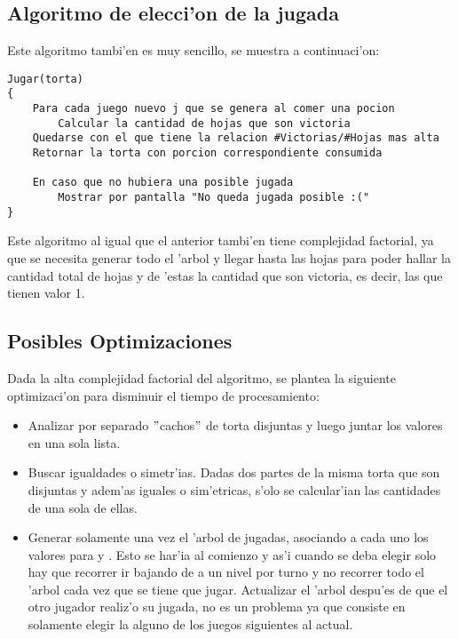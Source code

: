 \documentclass[spanish, a4paper, 10pt, titlepage]{article}
\begin{document}
\subsection{Algoritmo de elecci'on de la jugada}

Este algoritmo tambi'en es muy sencillo, se muestra a continuaci'on:

\begin{verbatim}
Jugar(torta)
{
    Para cada juego nuevo j que se genera al comer una pocion
        Calcular la cantidad de hojas que son victoria
    Quedarse con el que tiene la relacion #Victorias/#Hojas mas alta
    Retornar la torta con porcion correspondiente consumida

    En caso que no hubiera una posible jugada
        Mostrar por pantalla "No queda jugada posible :("
}
\end{verbatim}

Este algoritmo al igual que el anterior tambi'en tiene complejidad factorial, ya que se necesita generar todo el 'arbol y llegar hasta las hojas para poder hallar la cantidad total de hojas y de 'estas la cantidad que son victoria, es decir, las que tienen valor 1.

\subsection{Posibles Optimizaciones}

Dada la alta complejidad factorial del algoritmo, se plantea la siguiente optimizaci'on para disminuir el tiempo de procesamiento:

\begin{itemize}
\item Analizar por separado $"$cachos$"$ de torta disjuntas y luego juntar los valores en una sola lista.
\item Buscar igualdades o simetr'ias. Dadas dos partes de la misma torta que son disjuntas y adem'as iguales o sim'etricas, s'olo se calcular'ian las cantidades de una sola de ellas.
\item Generar solamente una vez el 'arbol de jugadas, asociando a cada uno los valores para  y . Esto se har'ia al comienzo y as'i cuando se deba elegir solo hay que recorrer ir bajando de a un nivel por turno y no recorrer todo el 'arbol cada vez que se tiene que jugar. Actualizar el 'arbol despu'es de que el otro jugador realiz'o su jugada, no es un problema ya que consiste en solamente elegir la alguno de los juegos siguientes al actual.
\end{itemize}
\end{document}
